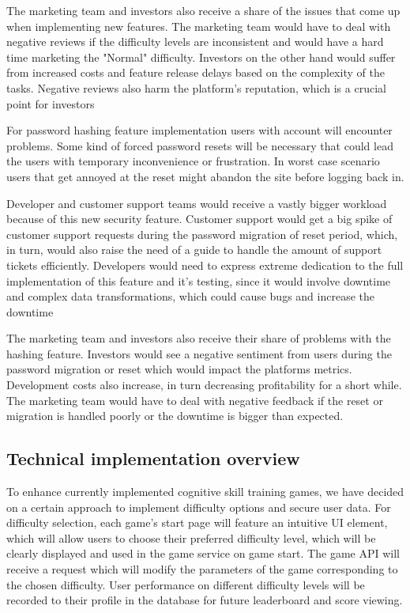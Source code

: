 \documentclass[11pt,a4paper]{article}
\begin{document}
The marketing team and investors also receive a share of the issues that come up when implementing new features. The marketing team would have to deal with negative reviews if the difficulty levels are inconsistent and would have a hard time marketing the "Normal" difficulty. Investors on the other hand would suffer from increased costs and feature release delays based on the complexity of the tasks. Negative reviews also harm the platform's reputation, which is a crucial point for investors

For password hashing feature implementation users with account will encounter problems. Some kind of forced password resets will be necessary that could lead the users with temporary inconvenience or frustration. In worst case scenario users that get annoyed at the reset might abandon the site before logging back in.

Developer and customer support teams would receive a vastly bigger workload because of this new security feature. Customer support would get a big spike of customer support requests during the password migration of reset period, which, in turn, would also raise the need of a guide to handle the amount of support tickets efficiently. Developers would need to express extreme dedication to the full implementation of this feature and it's testing, since it would involve downtime and complex data transformations, which could cause bugs and increase the downtime

The marketing team and investors also receive their share of problems with the hashing feature. Investors would see a negative sentiment from users during the password migration or reset which would impact the platforms metrics. Development costs also increase, in turn decreasing profitability for a short while. The marketing team would have to deal with negative feedback if the reset or migration is handled poorly or the downtime is bigger than expected.

\subsection{Technical implementation overview}

To enhance currently implemented cognitive skill training games, we have decided on a certain approach to implement difficulty options and secure user data. For difficulty selection, each game's start page will feature an intuitive UI element, which will allow users to choose their preferred difficulty level, which will be clearly displayed and used in the game service on game start. The game API will receive a request which will modify the parameters of the game corresponding to the chosen difficulty. User performance on different difficulty levels will be recorded to their profile in the database for future leaderboard and score viewing.
\end{document}
